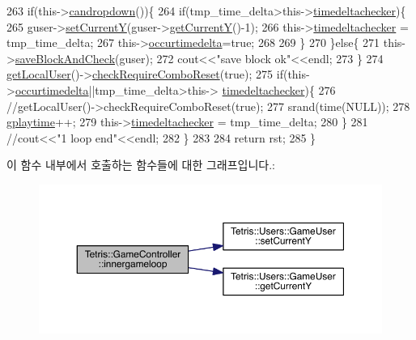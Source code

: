 \begin{DoxyCode}
263                 \textcolor{keywordflow}{if}(this->\hyperlink{class_tetris_1_1_game_controller_ac4993d5ad8640ac617fec341fdb301ee}{candropdown}())\{
264                     \textcolor{keywordflow}{if}(tmp\_time\_delta>this->\hyperlink{class_tetris_1_1_game_controller_a41b29ef9d04dcdc824e144a8a2cab543}{timedeltachecker})\{
265                         guser->\hyperlink{class_tetris_1_1_users_1_1_game_user_aeedbe521004c22018b73a509e99f7d81}{setCurrentY}(guser->\hyperlink{class_tetris_1_1_users_1_1_game_user_af5bd7ff0b575af1b42b093488cff97e2}{getCurrentY}()-1);
266                         this->\hyperlink{class_tetris_1_1_game_controller_a41b29ef9d04dcdc824e144a8a2cab543}{timedeltachecker} = tmp\_time\_delta;
267                         this->\hyperlink{class_tetris_1_1_game_controller_ac98e5fa60bd5bc9bb2e2c5210148f2cc}{occurtimedelta}=\textcolor{keyword}{true};
268                         
269                     \}
270                 \}\textcolor{keywordflow}{else}\{
271                     this->\hyperlink{class_tetris_1_1_game_controller_a3c63a9754e4cbeae4f66a5760bb4055d}{saveBlockAndCheck}(guser);
272                     cout<<\textcolor{stringliteral}{"save block ok"}<<endl;
273                 \}
274                 \hyperlink{class_tetris_1_1_game_controller_abc67d4b309ce2886b43a3b4e0af22abc}{getLocalUser}()->\hyperlink{class_tetris_1_1_users_1_1_game_user_a82ea0dfdb99643a1b577a22f5e504346}{checkRequireComboReset}(\textcolor{keyword}{true});
275                 \textcolor{keywordflow}{if}(this->\hyperlink{class_tetris_1_1_game_controller_ac98e5fa60bd5bc9bb2e2c5210148f2cc}{occurtimedelta}||tmp\_time\_delta>this->
      \hyperlink{class_tetris_1_1_game_controller_a41b29ef9d04dcdc824e144a8a2cab543}{timedeltachecker})\{
276                     \textcolor{comment}{//getLocalUser()->checkRequireComboReset(true);}
277                     srand(time(NULL));
278                     \hyperlink{class_tetris_1_1_game_controller_a562adcade20e362160535cd7248a2cce}{gplaytime}++;
279                      this->\hyperlink{class_tetris_1_1_game_controller_a41b29ef9d04dcdc824e144a8a2cab543}{timedeltachecker} = tmp\_time\_delta;
280                 \}
281                 \textcolor{comment}{//cout<<"1 loop end"<<endl;}
282             \}
283             
284             \textcolor{keywordflow}{return} rst;
285         \}
\end{DoxyCode}
이 함수 내부에서 호출하는 함수들에 대한 그래프입니다.\+:
\nopagebreak
\begin{figure}[H]
\begin{center}
\leavevmode
\includegraphics[width=350pt]{db/dd2/class_tetris_1_1_game_controller_a028a1a0270750bcae1e2e2cbbbe7609a_cgraph}
\end{center}
\end{figure}
